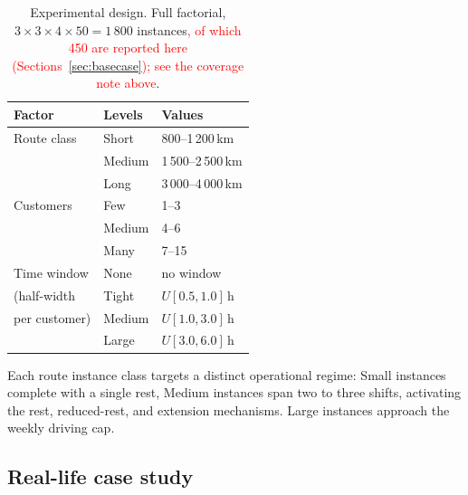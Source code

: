 \documentclass[preprint,12pt,3p]{elsarticle}
\newcommand{\red}[1]{\textcolor{red}{#1}}
\begin{document}
\begin{table}[ht]
\centering
\caption{Experimental design. Full factorial,
         $3 \times 3 \times 4 \times 50 = 1\,800$ instances\red{, of which 450 are reported here (Sections~\ref{sec:basecase}); see the coverage note above}.}
\label{tab:instances}
\small
\begin{tabular}{lll}
\toprule
\textbf{Factor} & \textbf{Levels} & \textbf{Values} \\
\midrule
Route class   & Short  & 800--1\,200\,km     \\
              & Medium & 1\,500--2\,500\,km  \\
              & Long   & 3\,000--4\,000\,km  \\
\midrule
Customers     & Few    & 1--3    \\
              & Medium & 4--6    \\
              & Many   & 7--15   \\
\midrule
Time window   & None   & no window         \\
 (half-width  & Tight  & $U[0.5, 1.0]$\,h  \\
 per customer)& Medium & $U[1.0, 3.0]$\,h  \\
              & Large  & $U[3.0, 6.0]$\,h  \\
\bottomrule
\end{tabular}
\end{table}

Each route instance class targets a distinct operational regime: Small instances complete with a single rest, Medium instances span two to three shifts, activating the rest, reduced-rest, and extension mechanisms. Large instances approach the weekly driving cap.

\subsection{Real-life case study}
\label{sec:casestudy}
\end{document}

